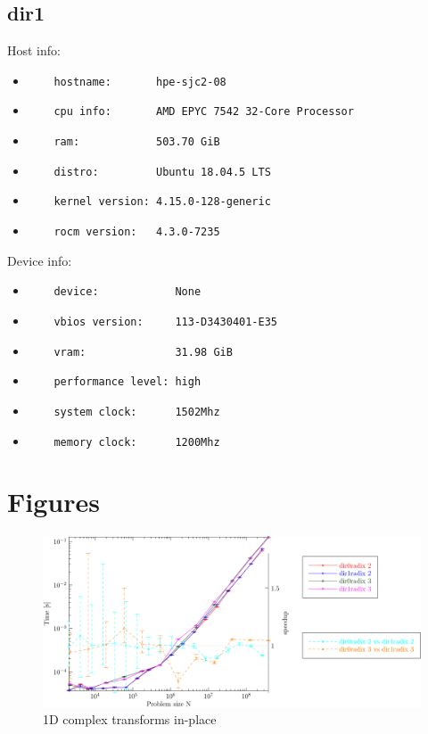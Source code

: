 \documentclass[12pt]{article}
\begin{document}
\subsection{dir1}
\noindent Host info:\begin{itemize}
\item \verb|    hostname:       hpe-sjc2-08|
\item \verb|    cpu info:       AMD EPYC 7542 32-Core Processor|
\item \verb|    ram:            503.70 GiB|
\item \verb|    distro:         Ubuntu 18.04.5 LTS|
\item \verb|    kernel version: 4.15.0-128-generic|
\item \verb|    rocm version:   4.3.0-7235|
\end{itemize}
Device info:\begin{itemize}
\item \verb|    device:            None|
\item \verb|    vbios version:     113-D3430401-E35|
\item \verb|    vram:              31.98 GiB|
\item \verb|    performance level: high|
\item \verb|    system clock:      1502Mhz|
\item \verb|    memory clock:      1200Mhz|
\end{itemize}

\clearpage

\section{Figures}

\centering
\begin{figure}[htbp]
   \includegraphics[width=\textwidth]{1d_c2cinplace_double.pdf}
   \caption{1D complex transforms in-place}
\end{figure}
\clearpage
\end{document}
